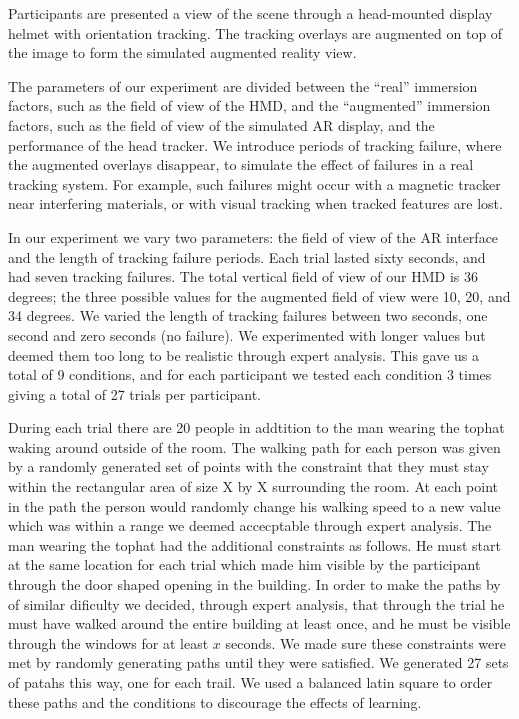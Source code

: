 \documentclass{acmsiggraph}                     %
\begin{document}
Participants are presented a view of the scene through a head-mounted display helmet with orientation tracking.  The tracking overlays are  augmented on top of the image to form the simulated augmented reality view.

The parameters of our experiment are divided between the ``real'' immersion factors, such as the field of view of the HMD, and the ``augmented'' immersion factors, such as the field of view of the simulated AR display, and the performance of the head tracker.  We introduce periods of tracking failure, where the augmented overlays disappear, to simulate the effect of failures in a real tracking system.  For example, such failures might occur with a magnetic tracker near interfering materials, or with visual tracking when tracked features are lost.

In our experiment we vary two parameters: the field of view of the AR interface and the length of tracking failure periods.  Each trial lasted sixty seconds, and had seven tracking failures.  The total vertical field of view of our HMD is 36 degrees; the three possible values for the augmented field of view were 10, 20, and 34 degrees.  We varied the length of tracking failures between two seconds, one second and zero seconds (no failure).  We experimented with longer values but deemed them too long to be realistic through expert analysis.  This gave us a total of 9 conditions, and for each participant we tested each condition 3 times giving a total of 27 trials per participant.

During each trial there are 20 people in addtition to the man wearing the tophat waking around outside of the room.  The walking path for each person was given by a randomly generated set of points with the constraint that they must stay within the rectangular area of size X by X surrounding the room.  At each point in the path the person would randomly change his walking speed to a new value which was within a range we deemed accecptable through expert analysis.  The man wearing the tophat had the additional constraints as follows.  He must start at the same location for each trial which made him visible by the participant through the door shaped opening in the building.  In order to make the paths by of similar dificulty we decided, through expert analysis, that through the trial he must have walked around the entire building at least once, and he must be visible through the windows for at least $x$ seconds.  We made sure these constraints were met by randomly generating paths until they were satisfied.  We generated 27 sets of patahs this way, one for each trail.  We used a balanced latin square to order these paths and the conditions to discourage the effects of learning.
\end{document}
